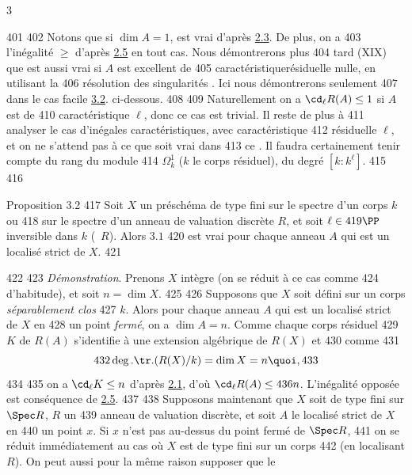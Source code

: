 3	\documentclass[10pt]{../fichiers-configuration-latex/smfart}
\begin{document}
   401	
   402	Notons que si $\dim A=1$,  est vrai d'après \hyperref[X.thm2.3]{2.3}. De plus, on a
   403	l'inégalité $\geq$ d'après \hyperref[X.cor2.5]{2.5} en tout cas. Nous démontrerons plus
   404	tard (XIX) que  est aussi vrai si $A$ est excellent de
   405	caractéristique\pageoriginale résiduelle nulle, en utilisant la
   406	résolution des singularités \cite{3}. Ici nous démontrerons  seulement
   407	dans le cas facile \hyperref[X.prop3.2]{3.2}. ci-dessous.
   408	
   409	Naturellement on a $\cd_{\ell}R(A)\leq 1$ si $A$ est de
   410	caractéristique $\ell$, donc ce cas est trivial. Il reste de plus à
   411	analyser le cas d'inégales caractéristiques, avec caractéristique
   412	résiduelle $\ell$, et on ne s'attend pas à ce que  soit vrai dans
   413	ce . Il faudra certainement tenir compte du rang du module
   414	$\Omega^1_k$ ($k$ le corps résiduel), \ie du degré $[k:k^{\ell}]$. %
   415	
   416	\begin{enonce*}{Proposition 3.2}
   417	Soit $X$ un préschéma de type fini sur le spectre d'un corps $k$ ou
   418	sur le spectre d'un anneau de valuation discrète $R$, et soit $\ell\in
   419	\PP$ inversible dans $k$ (\resp~$R$). Alors $3.1$
   420	est vrai pour chaque anneau $A$ qui est un localisé strict de $X$.
   421	\end{enonce*}
   422	
   423	\emph{Démonstration}. Prenons $X$ intègre (on se réduit à ce cas comme
   424	d'habitude), et soit $n=\dim X$.
   425	
   426	Supposons que $X$ soit défini sur un corps \emph{séparablement clos}
   427	$k$. Alors pour chaque anneau $A$ qui est un localisé strict de $X$ en
   428	un point \emph{fermé}, on a $\dim A=n$. Comme chaque corps résiduel
   429	$K$ de $R(A)$ s'identifie à une extension algébrique de $R(X)$ et
   430	comme
   431	$$
   432	\deg.\tr.(R(X)/k)=\dim X=n{\quoi},
   433	$$
   434	%
   435	on a $\cd_{\ell}K\leq n$ d'après \hyperref[X.thm2.1]{2.1}, d'où $\cd_{\ell}R(A)\leq
   436	n$. L'inégalité opposée est conséquence de \hyperref[X.cor2.5]{2.5}.
   437	
   438	Supposons maintenant que $X$ soit de type fini sur $\Spec R$, $R$ un
   439	anneau de valuation discrète, et soit $A$ le localisé strict de $X$ en
   440	un point $x$. Si $x$ n'est pas au-dessus du point fermé de $\Spec R$,
   441	on se réduit immédiatement au cas où $X$ est de type fini sur un corps
   442	(en localisant $R$). On peut aussi pour la même raison supposer que le
\end{document}
